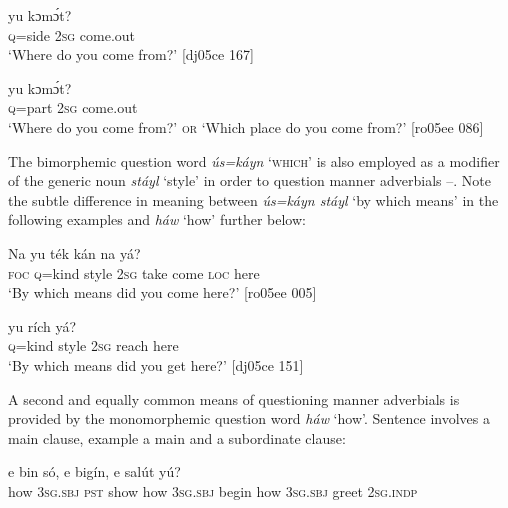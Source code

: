 \ea%
    \label{ex:key:627}
    \gll {}  yu  kɔmɔ́t?\\
\textsc{q}=side  \textsc{2sg}  come.out\\

\glt ‘Where do you come from?’ [dj05ce 167]
\z


\ea%
    \label{ex:key:628}
    \gll {}  yu  kɔmɔ́t?\\
\textsc{q}=part  \textsc{2sg}  come.out\\

\glt ‘Where do you come from?’ \textsc{or}  ‘Which place do you come from?’ [ro05ee 086]
\z

The bimorphemic question word \textit{ús=káyn} ‘\textsc{which’} is also employed as a modifier of the generic noun \textit{stáyl} ‘style’ in order to question manner adverbials –. Note the subtle difference in meaning between \textit{ús=káyn stáyl} ‘by which means’ in the following examples and \textit{háw} ‘how’ further below:


\ea%
    \label{ex:key:629}
    \gll Na      yu  ték    kán    na  yá?\\
\textsc{foc}  \textsc{q}=kind  style  \textsc{2sg}  take    come  \textsc{loc}  here\\

\glt ‘By which means did you come here?’ [ro05ee 005]\\
\z

\ea%
    \label{ex:key:630}
    \gll {}  yu  rích    yá?\\
\textsc{q}=kind    style  \textsc{2sg}  reach  here\\
\glt ‘By which means did you get here?’ [dj05ce 151]
\z

A second and equally common means of questioning manner adverbials is provided by the monomorphemic question word \textit{háw} ‘how’. Sentence  involves a main clause, example  a main and a subordinate clause: 


\ea%
    \label{ex:key:631}
    \gll {}  e    bin  só,        e    bigín,
   e    salút  yú?\\
how    \textsc{3sg.sbj}  \textsc{pst}  show  how    \textsc{3sg.sbj}  begin
how    \textsc{3sg.sbj}  greet  \textsc{2sg.indp}\\

